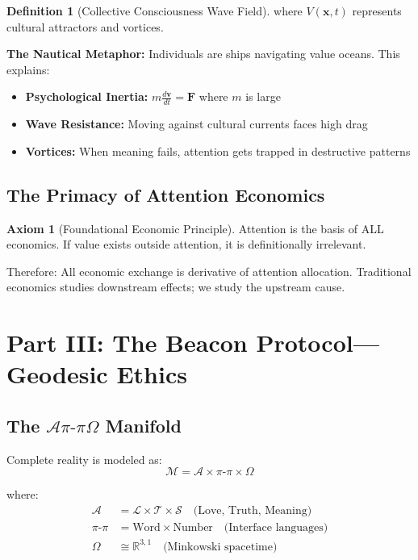 \documentclass[11pt,a4paper]{article}
\theoremstyle{definition}
\newtheorem{definition}{Definition}[section]
\newtheorem{axiom}{Axiom}[section]
\theoremstyle{remark}
\newcommand{\RR}{\mathbb{R}}
\begin{document}
\begin{small}
\begin{definition}[Collective Consciousness Wave Field]
where $V(\mathbf{x}, t)$ represents cultural attractors and vortices.
\end{definition}

\textbf{The Nautical Metaphor:} Individuals are ships navigating value oceans. This explains:
\begin{itemize}
\item \textbf{Psychological Inertia:} $m\frac{d\mathbf{v}}{dt} = \mathbf{F}$ where $m$ is large
\item \textbf{Wave Resistance:} Moving against cultural currents faces high drag
\item \textbf{Vortices:} When meaning fails, attention gets trapped in destructive patterns
\end{itemize}

\subsection{The Primacy of Attention Economics}

\begin{axiom}[Foundational Economic Principle]
Attention is the basis of ALL economics. If value exists outside attention, it is definitionally irrelevant.
\end{axiom}

Therefore: All economic exchange is derivative of attention allocation. Traditional economics studies downstream effects; we study the upstream cause.

\section{Part III: The Beacon Protocol—Geodesic Ethics}

\subsection{The $\mathcal{A}\pi\text{-}\pi\Omega$ Manifold}

Complete reality is modeled as:
\begin{equation}
\mathcal{M} = \mathcal{A} \times \pi\text{-}\pi \times \Omega
\end{equation}

where:
\begin{align}
\mathcal{A} &= \mathcal{L} \times \mathcal{T} \times \mathcal{S} \quad \text{(Love, Truth, Meaning)}\\
\pi\text{-}\pi &= \text{Word} \times \text{Number} \quad \text{(Interface languages)}\\
\Omega &\cong \RR^{3,1} \quad \text{(Minkowski spacetime)}
\end{align}


\end{small}
\end{document}
